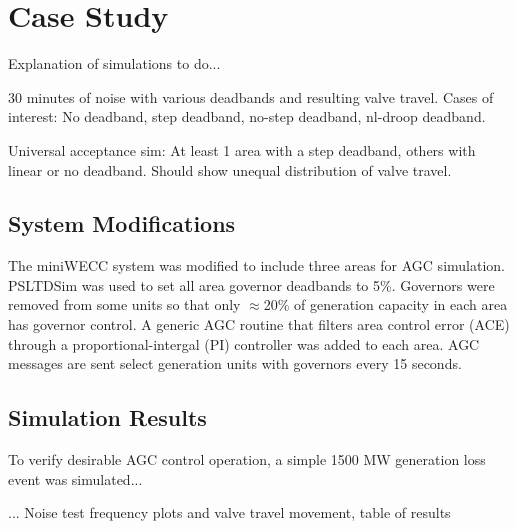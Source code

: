 \section{Case Study}
Explanation of simulations to do...

30 minutes of noise with various deadbands and resulting valve travel.
Cases of interest:
No deadband, step deadband, no-step deadband, nl-droop deadband.

Universal acceptance sim:
At least 1 area with a step deadband, others with linear or no deadband.
Should show unequal distribution of valve travel.

\subsection{System Modifications}
The miniWECC system was modified to include three areas for AGC simulation.
PSLTDSim was used to set all area governor deadbands to 5\%.
Governors were removed from some units so that only $\approx$20\% of generation capacity in each area has governor control.
A generic AGC routine that filters area control error (ACE) through a proportional-intergal (PI)  controller was added to each area.
AGC messages are sent select generation units with governors every 15 seconds.

\subsection{Simulation Results}
To verify desirable AGC control operation, a simple 1500 MW generation loss event was simulated...

...
Noise test frequency plots and valve travel movement, table of results